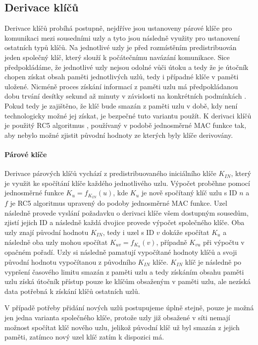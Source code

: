 \documentclass[11pt,final,twoside]{fithesis2}
\begin{document}
\subsection{Derivace klíčů}

Derivace klíčů probíhá postupně, nejdříve jsou ustanoveny párové klíče pro komunikaci mezi sousedními uzly a tyto jsou následně využity pro ustanovení ostatních typů klíčů. 
Na jednotlivé uzly je před rozmístěním predistribuován jeden společný klíč, který slouží k počátečnímu navázání komunikace. Sice předpokládáme, že jednotlivé uzly nejsou odolné vůči 
útoku a tedy že je útočník chopen získat obsah paměti jednotlivých uzlů, tedy i případné klíče v paměti uložené. Nicméně proces získání informací z paměti uzlu má předpokládanou dobu trvání desítky sekund 
až minuty v závislosti na konkrétních podmínkách \cite{Deng2005}. Pokud tedy je zajištěno, že klíč bude smazán z paměti uzlu v době, kdy není technologicky možné jej získat, je bezpečné tuto variantu použít.
K derivaci klíčů je použitý RC5 algoritmus \cite{Rivest1995}, používaný v podobě jednosměrné MAC funkce tak, aby nebylo možné zjistit původní hodnoty ze kterých byly klíče derivovány.

\paragraph{Párové klíče} 
Derivace párových klíčů vychází z predistribuovaného iniciálního klíče $K_{IN}$, který je využit ke spočítání klíče každého jednotlivého uzlu. Výpočet proběhne pomocí jednosměrné funkce 
$K_u=f_{K_{IN}}(u)$, kde $K_u$ je nově spočítaný klíč uzlu s ID $n$ a $f$ je RC5 algoritmus upravený do podoby jednosměrné MAC funkce. Uzel následně provede vyslání požadavku o derivaci klíče všem dostupným 
sousedům, zjistí jejich ID a následně každá dvojice provede výpočet společného klíče. Oba uzly znají původní hodnotu $K_{IN}$, tedy i uzel s ID $v$ dokáže spočítat $K_u$ a následně oba uzly mohou spočítat
$K_{uv} = f_{K_{u}}(v)$, případně $K_{vu}$ při výpočtu v opačném pořadí. Uzly si následně pamatují vypočítané hodnoty klíčů a svoji původní hodnotu vypočítanou z původního $K_{IN}$ klíče. 
$K_{IN}$ klíč je následně po vypršení časového limitu smazán z paměti uzlu a tedy získáním obsahu paměti uzlu získá útočník přístup pouze ke klíčům obsaženým v paměti uzlu, ale nezíská data potřebná k 
získání klíčů ostatních uzlů.

V případě potřeby přidání nových uzlů postupujeme úplně stejně, pouze je možná jen jedna varianta společného klíče, protože uzly již obsažené v síti nemají možnost spočítat klíč nového uzlu, jelikož 
původní klíč už byl smazán z jejich paměti, zatímco nový uzel klíč zatím k dispozici má. 
\end{document}

